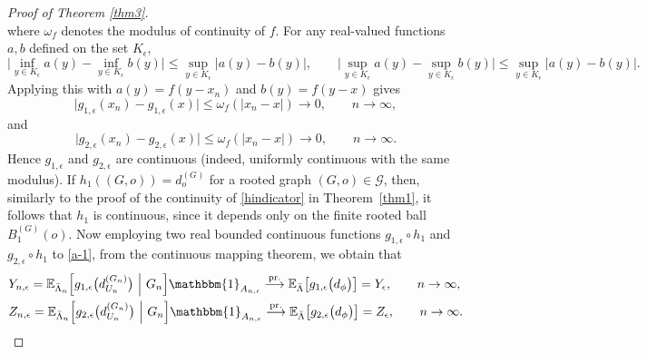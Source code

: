 \documentclass[11pt]{article}
\numberwithin{equation}{section}
\theoremstyle{plain}
\newcommand{\prob}{\overset{\mathrm{pr.}}{\longrightarrow}}
\newcommand{\E}{\mathbb E}
\newcommand{\dn}{d^{(G_{n})}}
\begin{document}
\begin{proof}[Proof of Theorem \ref{thm3}]
\[\]
where $\omega_f$ denotes the modulus of continuity of $f$. For any real-valued functions $a,b$ defined on the set $K_\epsilon$, 
\[
\Big| \inf_{y\in K_\epsilon} a(y) - \inf_{y\in K_\epsilon} b(y) \Big| 
\leq \sup_{y\in K_\epsilon} |a(y)-b(y)|,
\qquad
\Big| \sup_{y\in K_\epsilon} a(y) - \sup_{y\in K_\epsilon} b(y) \Big|
\leq \sup_{y\in K_\epsilon} |a(y)-b(y)|.
\]
Applying this with $a(y) = f(y - x_n)$ and $b(y) = f(y - x)$ gives
\[
\big| g_{1,\epsilon}(x_n) - g_{1,\epsilon}(x) \big|
\leq \omega_f(|x_n - x|) \to 0,\qquad n\to\infty,
\]
and 
\[
\big| g_{2,\epsilon}(x_n) - g_{2,\epsilon}(x) \big|
\leq \omega_f(|x_n - x|) \to 0,\qquad n\to\infty.
\]
Hence $g_{1,\epsilon}$ and $g_{2,\epsilon}$ are continuous 
(indeed, uniformly continuous with the same modulus).
If $h_1((G,o)) = d_o^{(G)}$ for a rooted graph $(G,o)\in\mathscr{G}$, then, similarly to the proof of the continuity of \eqref{hindicator} in Theorem~\ref{thm1}, it follows that $h_1$ is continuous, since it depends only on the finite rooted ball $B_1^{(G)}(o)$. Now employing two real bounded continuous functions $g_{1,\epsilon}\circ h_{1}$ and $g_{2,\epsilon}\circ h_{1}$ to \eqref{a-1}, from the continuous mapping theorem, we obtain that
\begin{equation}
\label{kn7}
\begin{aligned}
&Y_{n,\epsilon} = \E_{\bar{\Lambda}_{n}}\Big[g_{1,\epsilon}\big(\dn_{U_n}\big) 
~\Big|~ G_{n}\Big]\mathbbm{1}_{A_{n,\epsilon}}\prob\E_{\bar{\Lambda}}\big[g_{1,\epsilon}\big(d_{\phi}\big)\big]
= Y_{\epsilon},\qquad n\to\infty,\\
&Z_{n,\epsilon} = \E_{\bar{\Lambda}_{n}}\Big[g_{2,\epsilon}\big(\dn_{U_n}\big) 
~\Big|~ G_{n}\Big]\mathbbm{1}_{A_{n,\epsilon}}\prob\E_{\bar{\Lambda}}\big[g_{2,\epsilon}\big(d_{\phi}\big)\big]
= Z_{\epsilon},\qquad n\to\infty.
\end{aligned}
\end{equation}



\end{proof}
\end{document}
